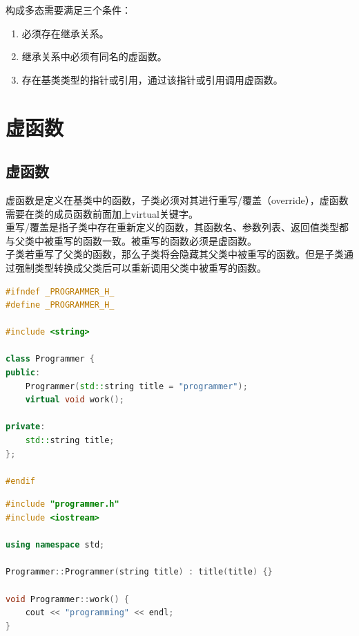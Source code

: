 构成多态需要满足三个条件：

\begin{enumerate}
	\item 必须存在继承关系。
	\item 继承关系中必须有同名的虚函数。
	\item 存在基类类型的指针或引用，通过该指针或引用调用虚函数。
\end{enumerate}

\newpage

\section{虚函数}

\subsection{虚函数}

虚函数是定义在基类中的函数，子类必须对其进行重写/覆盖（override），虚函数需要在类的成员函数前面加上virtual关键字。 \\

重写/覆盖是指子类中存在重新定义的函数，其函数名、参数列表、返回值类型都与父类中被重写的函数一致。被重写的函数必须是虚函数。 \\

子类若重写了父类的函数，那么子类将会隐藏其父类中被重写的函数。但是子类通过强制类型转换成父类后可以重新调用父类中被重写的函数。 \\


\begin{lstlisting}[language=C++, title=programmer.h]
#ifndef _PROGRAMMER_H_
#define _PROGRAMMER_H_

#include <string>

class Programmer {
public:
	Programmer(std::string title = "programmer");
	virtual void work();
	
private:
	std::string title;
};

#endif
\end{lstlisting}

\begin{lstlisting}[language=C++, title=programmer.cpp]
#include "programmer.h"
#include <iostream>

using namespace std;

Programmer::Programmer(string title) : title(title) {}

void Programmer::work() {
	cout << "programming" << endl;
}
\end{lstlisting}


